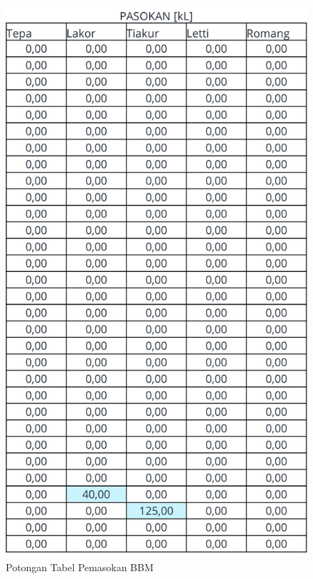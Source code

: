 \begin{figure}[!ht]
    \centering
    \includegraphics[width=0.95\linewidth,height=0.95\textheight,keepaspectratio]{lampiran/tabel-pasokan-simu.jpg}
    \caption*{Potongan Tabel Pemasokan BBM}
\end{figure}

